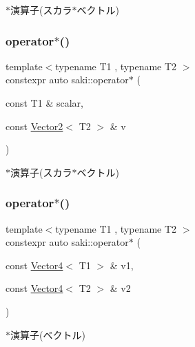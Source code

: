$\ast$演算子(スカラ$\ast$ベクトル) 

\mbox{\label{namespacesaki_aec277082fba09344ebcffc5bdab6eb49}} 
\subsubsection{\texorpdfstring{operator$\ast$()}{operator*()}\hspace{0.1cm}{\footnotesize\ttfamily [8/14]}}
{\footnotesize\ttfamily template$<$typename T1 , typename T2 $>$ \\
constexpr auto saki\+::operator$\ast$ (\begin{DoxyParamCaption}\item[{const T1 \&}]{scalar,  }\item[{const \mbox{\hyperlink{classsaki_1_1_vector2}{Vector2}}$<$ T2 $>$ \&}]{v }\end{DoxyParamCaption})}



$\ast$演算子(スカラ$\ast$ベクトル) 

\mbox{\label{namespacesaki_a7bddc36f87a91453fa188323d7bbdaee}} 
\subsubsection{\texorpdfstring{operator$\ast$()}{operator*()}\hspace{0.1cm}{\footnotesize\ttfamily [9/14]}}
{\footnotesize\ttfamily template$<$typename T1 , typename T2 $>$ \\
constexpr auto saki\+::operator$\ast$ (\begin{DoxyParamCaption}\item[{const \mbox{\hyperlink{classsaki_1_1_vector4}{Vector4}}$<$ T1 $>$ \&}]{v1,  }\item[{const \mbox{\hyperlink{classsaki_1_1_vector4}{Vector4}}$<$ T2 $>$ \&}]{v2 }\end{DoxyParamCaption})}



$\ast$演算子(ベクトル) 

\mbox{\label{namespacesaki_a44134827291df1234e04cbd1837a05ac}} 

